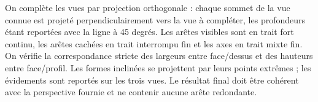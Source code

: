 \begin{corrigebox}
On complète les vues par projection orthogonale : chaque sommet de la
        vue connue est projeté perpendiculairement vers la vue à compléter, les
        profondeurs étant reportées avec la ligne à 45 degrés. Les arêtes visibles sont en
        trait fort continu, les arêtes cachées en trait interrompu fin et les axes en trait
        mixte fin. On vérifie la correspondance stricte des largeurs entre face/dessus et
        des hauteurs entre face/profil. Les formes inclinées se projettent par leurs points
        extrêmes ; les évidements sont reportés sur les trois vues. Le résultat final doit
        être cohérent avec la perspective fournie et ne contenir aucune arête redondante.
\end{corrigebox}
